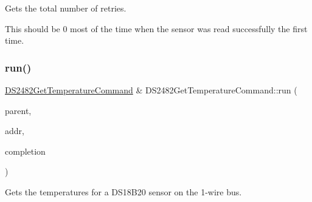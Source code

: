 Gets the total number of retries. 

This should be 0 most of the time when the sensor was read successfully the first time. \mbox{\label{class_d_s2482_get_temperature_command_a91c9ee5048047d209e3dd1effa1ba179}} 
\subsubsection{\texorpdfstring{run()}{run()}}
{\footnotesize\ttfamily \mbox{\hyperlink{class_d_s2482_get_temperature_command}{D\+S2482\+Get\+Temperature\+Command}} \& D\+S2482\+Get\+Temperature\+Command\+::run (\begin{DoxyParamCaption}\item[{\mbox{\hyperlink{class_d_s2482}{D\+S2482}} \&}]{parent,  }\item[{const \mbox{\hyperlink{class_d_s24821_wire_address}{D\+S24821\+Wire\+Address}} \&}]{addr,  }\item[{std\+::function$<$ void(\mbox{\hyperlink{class_d_s2482_get_temperature_command}{D\+S2482\+Get\+Temperature\+Command}} \&, int status, float tempC)$>$}]{completion }\end{DoxyParamCaption})\hspace{0.3cm}{\ttfamily [static]}}



Gets the temperatures for a D\+S18\+B20 sensor on the 1-\/wire bus. 


